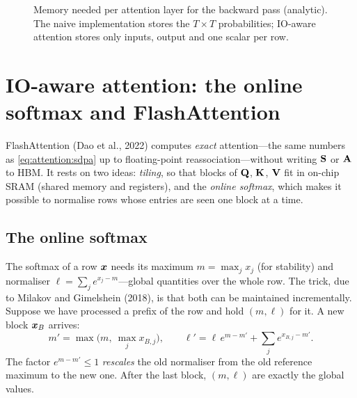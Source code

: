 \begin{figure}[t]
\centering
{}
\caption{Memory needed per attention layer for the backward pass (analytic). The naive
implementation stores the $T\times T$ probabilities; IO-aware attention stores only inputs, output
and one scalar per row.}
\label{fig:attention:mem}
\end{figure}

\section{IO-aware attention: the online softmax and FlashAttention}\label{sec:attention:flash}

FlashAttention (Dao et al., 2022) computes \emph{exact} attention---the same numbers as
\cref{eq:attention:sdpa} up to floating-point reassociation---without writing $\mathbf{S}$ or
$\mathbf{A}$ to HBM. It rests on two ideas: \emph{tiling}, so that blocks of $\mathbf{Q}$, $\mathbf{K}$, $\mathbf{V}$
fit in on-chip SRAM (shared memory and registers), and the \emph{online softmax}, which makes it
possible to normalise rows whose entries are seen one block at a time.

\subsection{The online softmax}
The softmax of a row $\bm{x}$ needs its maximum $m=\max_j x_j$ (for stability) and normaliser
$\ell=\sum_j e^{x_j-m}$---global quantities over the whole row. The trick, due to Milakov and
Gimelshein (2018), is that both can be maintained incrementally. Suppose we have processed a prefix
of the row and hold $(m,\ell)$ for it. A new block $\bm{x}_B$ arrives:
\begin{equation}
m' = \max\big(m,\ \max_j x_{B,j}\big),\qquad
\ell' = \ell\,e^{m-m'} + \sum_j e^{x_{B,j}-m'} .
\label{eq:attention:online}
\end{equation}
The factor $e^{m-m'}\le 1$ \emph{rescales} the old normaliser from the old reference maximum to
the new one. After the last block, $(m,\ell)$ are exactly the global values.

